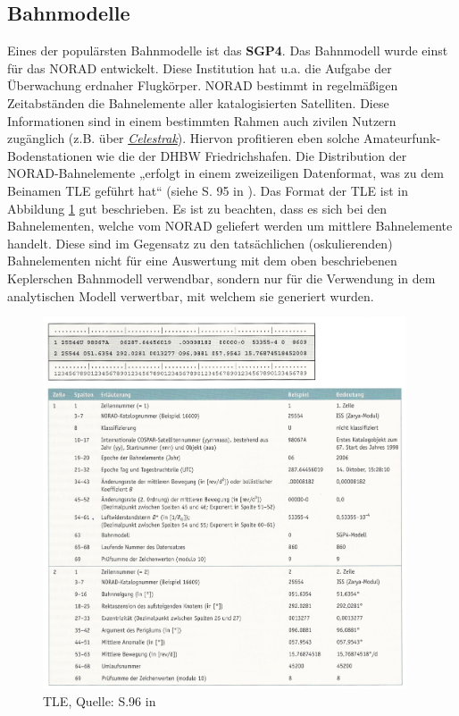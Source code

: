 \subsection{Bahnmodelle}
\label{chap:models}
Eines der populärsten Bahnmodelle ist das \textbf{\ac{SGP4}}. Das Bahnmodell wurde einst für das \ac{NORAD} entwickelt. Diese Institution hat u.a. die Aufgabe der Überwachung erdnaher Flugkörper. \ac{NORAD} bestimmt in regelmäßigen Zeitabständen die Bahnelemente aller katalogisierten Satelliten. Diese Informationen sind in einem bestimmten Rahmen auch zivilen Nutzern zugänglich (z.B. über \href{http://celestrak.com/}{\textit{Celestrak}}). Hiervon profitieren eben solche Amateurfunk-Bodenstationen wie die der DHBW Friedrichshafen. Die Distribution der \ac{NORAD}-Bahnelemente „erfolgt in einem zweizeiligen Datenformat, was zu dem Beinamen \ac{TLE} geführt hat“ (siehe S. 95 in \cite{HandRaum}). Das Format der \ac{TLE} ist in Abbildung \ref{fig:tle} gut beschrieben. Es ist zu beachten, dass es sich bei den Bahnelementen, welche vom \ac{NORAD} geliefert werden um mittlere Bahnelemente handelt. Diese sind im Gegensatz zu den tatsächlichen (oskulierenden) Bahnelementen nicht für eine Auswertung mit dem oben beschriebenen Keplerschen Bahnmodell verwendbar, sondern nur für die Verwendung in dem analytischen Modell verwertbar, mit welchem sie generiert wurden. 
\begin{figure}[h]                                                                           %
	\centering                                                                            	%
	\includegraphics[width=0.96\textwidth]{./images/tle.jpg}              			            %
	\caption[\ac{TLE}]{\ac{TLE}, Quelle: S.96 in \cite{HandRaum}}                           %
	\label{fig:tle}                                                                         %
\end{figure}                                                                              	%
